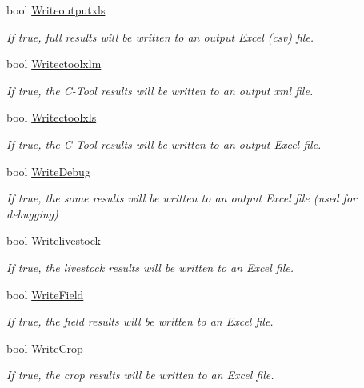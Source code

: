 \begin{DoxyCompactItemize}
bool \mbox{\hyperlink{class_global_vars_a26572bfb2be10514cb90a8dbde59707d}{Writeoutputxls}}
\begin{DoxyCompactList}\small\item\em If true, full results will be written to an output Excel (csv) file. \end{DoxyCompactList}\item 
bool \mbox{\hyperlink{class_global_vars_a6ff90bb2dc87741b31f307a021fefcda}{Writectoolxlm}}
\begin{DoxyCompactList}\small\item\em If true, the C-\/\+Tool results will be written to an output xml file. \end{DoxyCompactList}\item 
bool \mbox{\hyperlink{class_global_vars_ab53683e6475ea986a6c609b7647f2e66}{Writectoolxls}}
\begin{DoxyCompactList}\small\item\em If true, the C-\/\+Tool results will be written to an output Excel file. \end{DoxyCompactList}\item 
bool \mbox{\hyperlink{class_global_vars_ab5e94b1f1db204716c7ce560fb63cfd7}{Write\+Debug}}
\begin{DoxyCompactList}\small\item\em If true, the some results will be written to an output Excel file (used for debugging) \end{DoxyCompactList}\item 
bool \mbox{\hyperlink{class_global_vars_a1dc3e2876af71bd82de8365638c291ff}{Writelivestock}}
\begin{DoxyCompactList}\small\item\em If true, the livestock results will be written to an Excel file. \end{DoxyCompactList}\item 
bool \mbox{\hyperlink{class_global_vars_af83092827619cbb7ed64caf4daee213c}{Write\+Field}}
\begin{DoxyCompactList}\small\item\em If true, the field results will be written to an Excel file. \end{DoxyCompactList}\item 
bool \mbox{\hyperlink{class_global_vars_af07e4af0b4713de60efee52510ffa5ce}{Write\+Crop}}
\begin{DoxyCompactList}\small\item\em If true, the crop results will be written to an Excel file. \end{DoxyCompactList}\item 

\end{DoxyCompactItemize}
